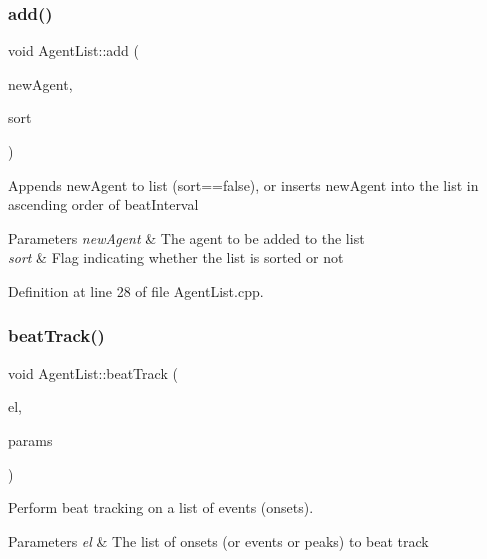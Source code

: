 \mbox{\label{class_agent_list_abe2ceeb7ffcf4d07375677d6f238afc1}} 
\subsubsection{\texorpdfstring{add()}{add()}\hspace{0.1cm}{\footnotesize\ttfamily [2/2]}}
{\footnotesize\ttfamily void Agent\+List\+::add (\begin{DoxyParamCaption}\item[{\hyperlink{class_agent}{Agent} $\ast$}]{new\+Agent,  }\item[{bool}]{sort }\end{DoxyParamCaption})}

Appends new\+Agent to list (sort==false), or inserts new\+Agent into the list in ascending order of beat\+Interval 
\begin{DoxyParams}{Parameters}
{\em new\+Agent} & The agent to be added to the list \\
\hline
{\em sort} & Flag indicating whether the list is sorted or not \\
\hline
\end{DoxyParams}


Definition at line 28 of file Agent\+List.\+cpp.

\mbox{\label{class_agent_list_a671100a72e0990f371c6ca892b020498}} 
\subsubsection{\texorpdfstring{beat\+Track()}{beatTrack()}\hspace{0.1cm}{\footnotesize\ttfamily [1/2]}}
{\footnotesize\ttfamily void Agent\+List\+::beat\+Track (\begin{DoxyParamCaption}\item[{const Event\+List \&}]{el,  }\item[{const \hyperlink{class_agent_parameters}{Agent\+Parameters} \&}]{params }\end{DoxyParamCaption})\hspace{0.3cm}{\ttfamily [inline]}}

Perform beat tracking on a list of events (onsets). 
\begin{DoxyParams}{Parameters}
{\em el} & The list of onsets (or events or peaks) to beat track \\
\hline
\end{DoxyParams}


